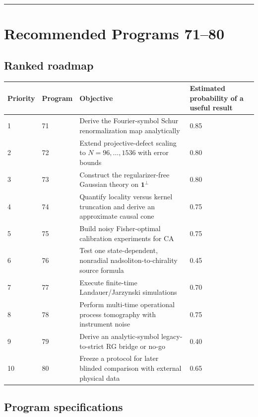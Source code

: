 \documentclass[11pt,a4paper,openany]{report}
\begin{document}
\par\medskip\hrule\medskip

\chapter{Recommended Programs 71–80}

\section{Ranked roadmap}

\begin{center}
\begingroup\small
\setlength{\tabcolsep}{3.5pt}
\renewcommand{\arraystretch}{1.16}
\begin{longtable}{@{}p{}p{}p{}p{}@{}}
\toprule
\textbf{Priority} & \textbf{Program} & \textbf{Objective} & \textbf{Estimated probability of a useful result} \\
\midrule
\endhead
1 & 71 & Derive the Fourier-symbol Schur renormalization map analytically & 0.85 \\
2 & 72 & Extend projective-defect scaling to \(N=96,\ldots,1536\) with error bounds & 0.80 \\
3 & 73 & Construct the regularizer-free Gaussian theory on \(\mathbf1^\perp\) & 0.80 \\
4 & 74 & Quantify locality versus kernel truncation and derive an approximate causal cone & 0.75 \\
5 & 75 & Build noisy Fisher-optimal calibration experiments for CA & 0.75 \\
6 & 76 & Test one state-dependent, nonradial nadsoliton-to-chirality source formula & 0.45 \\
7 & 77 & Execute finite-time Landauer/\allowbreak{}Jarzynski simulations & 0.70 \\
8 & 78 & Perform multi-time operational process tomography with instrument noise & 0.75 \\
9 & 79 & Derive an analytic-symbol legacy-to-strict RG bridge or no-go & 0.40 \\
10 & 80 & Freeze a protocol for later blinded comparison with external physical data & 0.65 \\
\bottomrule
\end{longtable}
\endgroup
\end{center}

\section{Program specifications}
\end{document}
